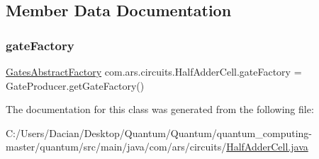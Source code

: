 \subsection{Member Data Documentation}
\hypertarget{classcom_1_1ars_1_1circuits_1_1_half_adder_cell_a5f7e032657ce1f64a8c735bac276653d}{}\label{classcom_1_1ars_1_1circuits_1_1_half_adder_cell_a5f7e032657ce1f64a8c735bac276653d} 
\subsubsection{\texorpdfstring{gate\+Factory}{gateFactory}}
{\footnotesize\ttfamily \hyperlink{classcom_1_1ars_1_1gates_1_1_gates_abstract_factory}{Gates\+Abstract\+Factory} com.\+ars.\+circuits.\+Half\+Adder\+Cell.\+gate\+Factory = Gate\+Producer.\+get\+Gate\+Factory()\hspace{0.3cm}{\ttfamily [protected]}}



The documentation for this class was generated from the following file\+:\begin{DoxyCompactItemize}
\item 
C\+:/\+Users/\+Dacian/\+Desktop/\+Quantum/\+Quantum/quantum\+\_\+computing-\/master/quantum/src/main/java/com/ars/circuits/\hyperlink{src_2main_2java_2com_2ars_2circuits_2_half_adder_cell_8java}{Half\+Adder\+Cell.\+java}\end{DoxyCompactItemize}
